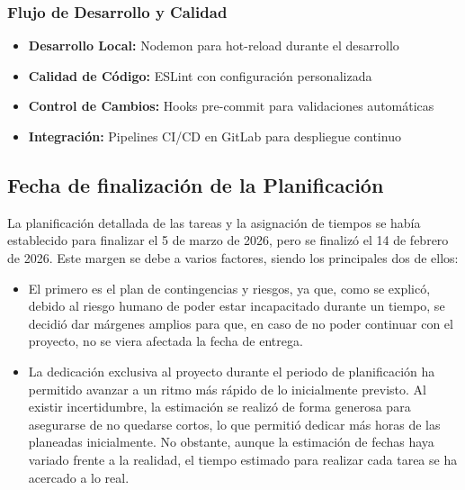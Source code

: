 \subsubsection{Flujo de Desarrollo y Calidad}

\begin{itemize}
    \item \textbf{Desarrollo Local:} Nodemon para hot-reload durante el desarrollo
    \item \textbf{Calidad de Código:} ESLint con configuración personalizada
    \item \textbf{Control de Cambios:} Hooks pre-commit para validaciones automáticas
    \item \textbf{Integración:} Pipelines CI/CD en GitLab para despliegue continuo
\end{itemize}

\subsection{Fecha de finalización de la Planificación}
La planificación detallada de las tareas y la asignación de tiempos se había establecido para finalizar el 5 de marzo de 2026, pero se finalizó el 14 de febrero de 2026. Este margen se debe a varios factores, siendo los principales dos de ellos:
\begin{itemize}
    \item El primero es el plan de contingencias y riesgos, ya que, como se explicó, debido al riesgo humano de poder estar incapacitado durante un tiempo, se decidió dar márgenes amplios para que, en caso de no poder continuar con el proyecto, no se viera afectada la fecha de entrega.
    \item La dedicación exclusiva al proyecto durante el periodo de planificación ha permitido avanzar a un ritmo más rápido de lo inicialmente previsto. Al existir incertidumbre, la estimación se realizó de forma generosa para asegurarse de no quedarse cortos, lo que permitió dedicar más horas de las planeadas inicialmente. No obstante, aunque la estimación de fechas haya variado frente a la realidad, el tiempo estimado para realizar cada tarea se ha acercado a lo real.
\end{itemize}

